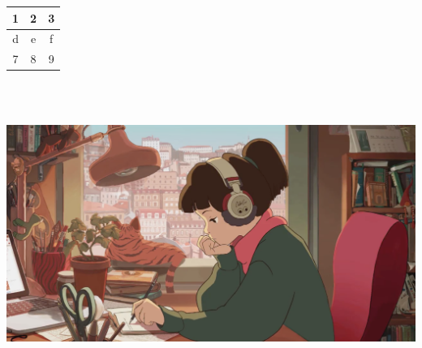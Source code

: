 \documentclass{article}
\begin{document}
\begin{tabular}{|c|c|c|}
\hline
1 & 2 & 3 \\
\hline
d & e & f \\
\hline
7 & 8 & 9 \\
\hline
\end{tabular}
\\\\
\begin{figure}
\centering
\end{figure}\includegraphics[width=\textwidth]{"../resources/1.png"}
\end{document}
